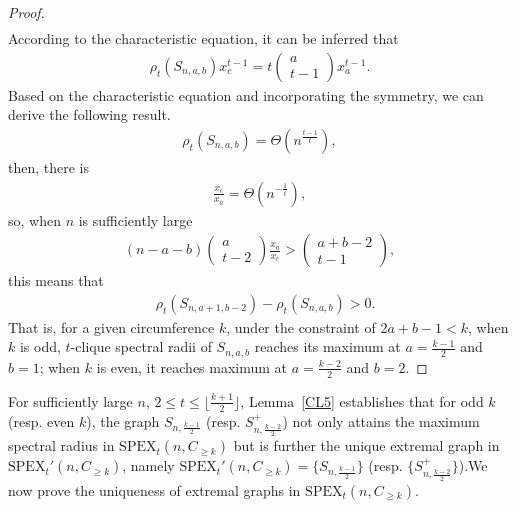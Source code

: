 \documentclass[preprint,12pt]{elsarticle}
\begin{document}
\begin{proof}
\begin{align*}
                \end{align*}
            According to the characteristic equation, it can be inferred that
                \begin{align*}
                    \rho_t(S_{n,a,b})x_c^{t-1}=t\begin{pmatrix} a\\t-1 \end{pmatrix}x_a^{t-1}.
                \end{align*}
            Based on the characteristic equation and incorporating the symmetry, we can derive the following result.
                \begin{align*}
                    \rho_t(S_{n,a,b})=\Theta(n^{\frac{t-1}{t}}),
                \end{align*}
            then, there is
                \begin{align*}
                    \frac{x_c}{x_a}=\Theta(n^{-\frac{1}{t}}),
                \end{align*}
            so, when $n $ is sufficiently large
                \begin{align*}
                    (n-a-b)\begin{pmatrix} a\\t-2 \end{pmatrix}\frac{x_a}{x_c} > \begin{pmatrix} a+b-2\\t-1 \end{pmatrix},
                \end{align*}
            this means that
                \begin{align*}
                    &\rho_t(S_{n,a+1,b-2})-\rho_t(S_{n,a,b}) > 0.
                \end{align*}
            That is, for a given circumference $k$, under the constraint of $2a+b-1 < k$, when $k$ is odd, $t$-clique spectral radii of $S_{n,a,b}$ reaches its maximum at $a= \frac{k-1}{2} $ and $b=1$; when $k$ is even, it reaches maximum at $a= \frac{k-2}{2} $ and $b=2$.

        \end{proof}

        For sufficiently large $n$, $2 \leq t \leq \lfloor \frac{k+1}{2} \rfloor$, Lemma~\ref{CL5} establishes that for odd $k$ (resp. even $k$), the graph $S_{n, \frac{k-1}{2} }$ (resp. $S_{n, \frac{k-2}{2} }^+$) not only attains the maximum spectral radius in $\mathrm{SPEX}_t(n,C_{\geq k})$ but is further the unique extremal graph in $\mathrm{SPEX}_t'(n,C_{\geq k})$, namely $\mathrm{SPEX}_t'(n,C_{\geq k})=\{S_{n, \frac{k-1}{2} }\}$ (resp. $\{S_{n, \frac{k-2}{2} }^+\}$).We now prove the uniqueness of extremal graphs in $\mathrm{SPEX}_t(n,C_{\geq k})$.
\end{document}
